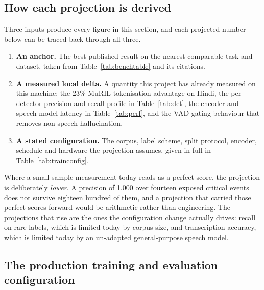 \documentclass[11pt,a4paper]{article}
\begin{document}
\subsection{How each projection is derived}
\label{sec:projmethod}
Three inputs produce every figure in this section, and each projected number below can be traced back
through all three.

\begin{enumerate}
  \item \textbf{An anchor.} The best published result on the nearest comparable task and dataset,
        taken from Table~\ref{tab:benchtable} and its citations.
  \item \textbf{A measured local delta.} A quantity this project has already measured on this
        machine: the 23\% MuRIL tokenisation advantage on Hindi, the per-detector precision and
        recall profile in Table~\ref{tab:det}, the encoder and speech-model latency in
        Table~\ref{tab:perf}, and the VAD gating behaviour that removes non-speech hallucination.
  \item \textbf{A stated configuration.} The corpus, label scheme, split protocol, encoder, schedule
        and hardware the projection assumes, given in full in Table~\ref{tab:trainconfig}.
\end{enumerate}

\begin{keybox}[title={The principle behind the numbers in this section}]
\small
Where a small-sample measurement today reads as a perfect score, the projection is deliberately
\emph{lower}. A precision of 1.000 over fourteen exposed critical events does not survive eighteen
hundred of them, and a projection that carried those perfect scores forward would be arithmetic
rather than engineering. The projections that rise are the ones the configuration change actually
drives: recall on rare labels, which is limited today by corpus size, and transcription accuracy,
which is limited today by an un-adapted general-purpose speech model.
\end{keybox}

\subsection{The production training and evaluation configuration}
\end{document}
